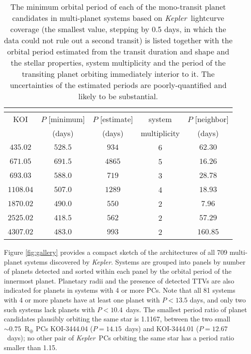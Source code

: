 \documentclass{aastex62}
\newcommand{\ikt}{{\it Kepler}}
\newcommand{\ik}{{\it Kepler~}}
\begin{document}
\begin{table}[]
    \centering
    \begin{tabular}{|c|c|c|c|c|}
        \multicolumn{5}{c}{}\\
        \hline
        KOI & $P$ [minimum] & $P$ [estimate] & system & $P$ [neighbor]\\
         & (days) & (days) & multiplicity & (days)\\
        \hline
        $435.02$  & $528.5$ & $934$ & 6 & $62.30$\\
        $671.05$  & $691.5$ & $4865$ & 5 & $16.26$\\
        $693.03$  & $588.0$ & $719$ & 3 & $28.78$\\
        $1108.04$ & $507.0$ & $1289$ & 4 & $18.93$\\
        $1870.02$ & $490.0$ & $550$ & 2 & $7.96$\\
        $2525.02$ & $418.5$ & $562$ & 2 & $57.29$\\
        $4307.02$ & $483.0$ & $993$ & 2 & $160.85$ \\
        \hline
        \end{tabular} 
 \caption{ {The minimum orbital period of each of the mono-transit planet candidates in multi-planet systems based on \ik lightcurve coverage (the smallest value, stepping by 0.5 days, in which the data could not rule out a second transit) is listed together with the orbital period estimated from the transit duration and shape and the stellar properties, system multiplicity and the period of the transiting planet orbiting immediately interior to it.  The uncertainties of the estimated periods are poorly-quantified and likely to be substantial. }}
    \label{tab:minp}
\end{table}



Figure \ref{fig:gallery} provides a compact sketch of the architectures of all 709 multi-planet systems discovered by \ikt.  Systems are grouped into panels by number of planets detected and sorted within each panel by the orbital period of the innermost planet. Planetary radii and the presence of detected TTVs are also indicated for planets in systems with 4 or more PCs.  Note that all 81 systems with 4 or more planets have at least one planet with $P<13.5$ days, and only two such systems lack planets with $P<10.4$~days. The smallest period ratio of planet candidates plausibly orbiting the same star is 1.1167, between the two small $\sim 0.75$~R$_\oplus$ PCs KOI-3444.04 ($P = 14.15$~days) and  KOI-3444.01 ($P = 12.67$~days); no other pair of \ik PCs orbiting the same star has a period ratio smaller than 1.15.
\end{document}
